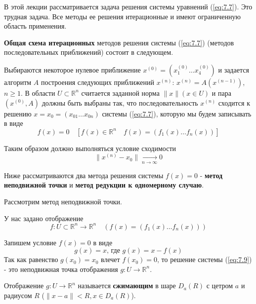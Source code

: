 В этой лекции рассматривается задача решения системы уравнений (\ref{eq:7.7}). Это трудная задача. Все методы ее решения итерационные и имеют ограниченную область применения. 

\textbf{Общая схема итерационных} методов решения системы (\ref{eq:7.7}) (методов последовательных приближений) состоит в следующем.

Выбираются некоторое нулевое приближение $x^{(0)} = (x_1^{(0)} \dots x_4^{(0)})$ и задается алгоритм $A$ построения следующих приближений $x^{(n)}$: $x^{(n)} = A(x^{(n-1)})$, $n \geq 1$. В области $U \subset \mathbb{R}^n$ считается заданной норма $\|x\| (x \in U)$ и пара $(x^{(0)}, A)$ должны быть выбраны так, что последовательность $x^{(n)}$ сходится к решению $x = x_0 = (x_{01} \dots x_{0n})$ системы (\ref{eq:7.7}), которую мы будем записывать в виде
\begin{equation} \label{eq:7.9}
	f(x) = 0 \quad [f(x) \in \mathbb{R}^n \quad f(x) = (f_1(x) \dots f_n(x))]
\end{equation}

Таким образом должно выполняться условие сходимости
\begin{equation} \label{eq:7.10}
	\|x^{(n)} - x_0\| \xrightarrow[n \to \infty]{} 0
\end{equation}

Ниже рассматриваются два метода решения системы $f(x) = 0$ - \textbf{метод неподвижной точки} и \textbf{метод редукции к одномерному случаю}.

Рассмотрим метод неподвижной точки.

У нас задано отображение
\begin{equation} \label{eq:7.11}
	f: U \subset \mathbb{R}^n \to \mathbb{R}^n \quad (f(x) = (f_1(x) \dots f_n(x)))
\end{equation}

Запишем условие $f(x) = 0$ в виде
\begin{equation} \label{eq:7.12}
	g(x) = x \textrm{, где } g(x) = x - f(x)
\end{equation}
Так как равенство $g(x_0) = x_0$ влечет $f(x_0) = 0$, то решение системы (\ref{eq:7.9}) - это неподвижная точка отображения $g: U \to \mathbb{R}^n$.

Отображение $g: U \to \mathbb{R}^n$ называется \textbf{сжимающим} в шаре $D_a(R)$ с цетром $a$ и радиусом $R$ ($\|x - a\| < R, x \in D_a(R)$).

